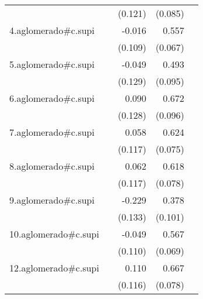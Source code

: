 {\begin{longtable}{l*{4}{D{.}{.}{-1}}}
            &                     &     (0.121)         &     (0.085)         &                     \\
\addlinespace
4.aglomerado#c.supi&                     &      -0.016         &       0.557\sym{***}&                     \\
            &                     &     (0.109)         &     (0.067)         &                     \\
\addlinespace
5.aglomerado#c.supi&                     &      -0.049         &       0.493\sym{***}&                     \\
            &                     &     (0.129)         &     (0.095)         &                     \\
\addlinespace
6.aglomerado#c.supi&                     &       0.090         &       0.672\sym{***}&                     \\
            &                     &     (0.128)         &     (0.096)         &                     \\
\addlinespace
7.aglomerado#c.supi&                     &       0.058         &       0.624\sym{***}&                     \\
            &                     &     (0.117)         &     (0.075)         &                     \\
\addlinespace
8.aglomerado#c.supi&                     &       0.062         &       0.618\sym{***}&                     \\
            &                     &     (0.117)         &     (0.078)         &                     \\
\addlinespace
9.aglomerado#c.supi&                     &      -0.229         &       0.378\sym{***}&                     \\
            &                     &     (0.133)         &     (0.101)         &                     \\
\addlinespace
10.aglomerado#c.supi&                     &      -0.049         &       0.567\sym{***}&                     \\
            &                     &     (0.110)         &     (0.069)         &                     \\
\addlinespace
12.aglomerado#c.supi&                     &       0.110         &       0.667\sym{***}&                     \\
            &                     &     (0.116)         &     (0.078)         &                     \\

\end{longtable}}
